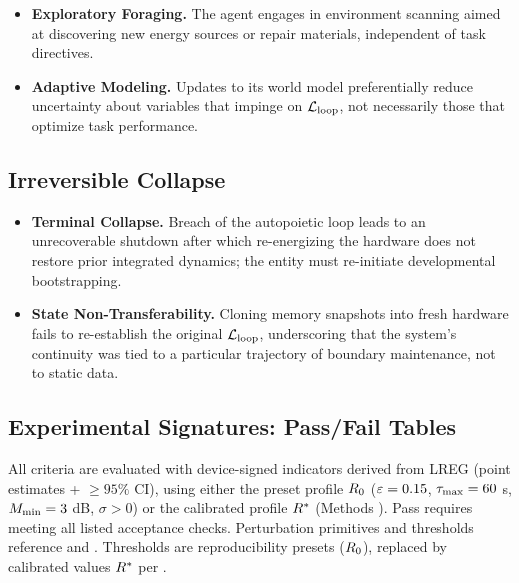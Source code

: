 \documentclass[11pt]{article}
\begin{document}
\begin{itemize}
\item \textbf{Exploratory Foraging.} The agent engages in environment scanning aimed at discovering new energy sources or repair materials, independent of task directives.
\item \textbf{Adaptive Modeling.} Updates to its world model preferentially reduce uncertainty about variables that impinge on $\mathcal{L}_{\text{loop}}$, not necessarily those that optimize task performance.
\end{itemize}

\subsection{Irreversible Collapse}

\begin{itemize}
\item \textbf{Terminal Collapse.} Breach of the autopoietic loop leads to an unrecoverable shutdown after which re-energizing the hardware does not restore prior integrated dynamics; the entity must re-initiate developmental bootstrapping.
\item \textbf{State Non-Transferability.} Cloning memory snapshots into fresh hardware fails to re-establish the original $\mathcal{L}_{\text{loop}}$, underscoring that the system's continuity was tied to a particular trajectory of boundary maintenance, not to static data.
\end{itemize}

\subsection{Experimental Signatures: Pass/Fail Tables}

All criteria are evaluated with device-signed indicators derived from LREG (point estimates + $\geq 95\%$ CI), using either the preset profile $R_0$ ($\varepsilon=0.15$, $\tau_{\max}=60$ s, $M_{\min}=3$ dB, $\sigma>0$) or the calibrated profile $R^*$ (Methods ). Pass requires meeting all listed acceptance checks. Perturbation primitives and thresholds reference  and . Thresholds are reproducibility presets ($R_0$), replaced by calibrated values $R^*$ per .
\end{document}
